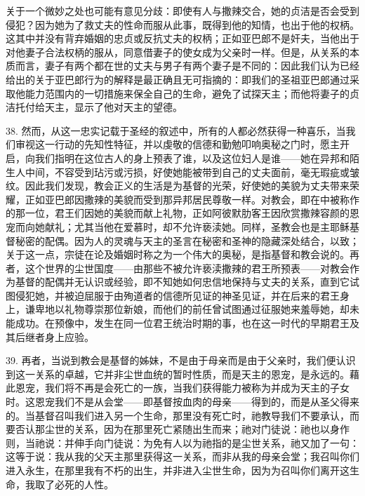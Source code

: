 关于一个微妙之处也可能有意见分歧：即使有人与撒辣交合，她的贞洁是否会受到侵犯？因为她为了救丈夫的性命而服从此事，既得到他的知情，也出于他的权柄。这其中并没有背弃婚姻的忠贞或反抗丈夫的权柄；正如亚巴郎不是奸夫，当他出于对他妻子合法权柄的服从，同意借妻子的使女成为父亲时一样。但是，从关系的本质而言，妻子有两个都在世的丈夫与男子有两个妻子是不同的：因此我们认为已经给出的关于亚巴郎行为的解释是最正确且无可指摘的：即我们的圣祖亚巴郎通过采取他能力范围内的一切措施来保全自己的生命，避免了试探天主；而他将妻子的贞洁托付给天主，显示了他对天主的望德。\par

38. 然而，从这一忠实记载于圣经的叙述中，所有的人都必然获得一种喜乐，当我们审视这一行动的先知性特征，并以虔敬的信德和勤勉叩响奥秘之门时，愿主开启，向我们指明在这位古人的身上预表了谁，以及这位妇人是谁——她在异邦和陌生人中间，不容受到玷污或污损，好使她能被带到自己的丈夫面前，毫无瑕疵或皱纹。因此我们发现，教会正义的生活是为基督的光荣，好使她的美貌为丈夫带来荣耀，正如亚巴郎因撒辣的美貌而受到那异邦居民尊敬一样。对教会，即在中被称作的那一位，君王们因她的美貌而献上礼物，正如阿彼默肋客王因欣赏撒辣容颜的恩宠而向她献礼；尤其当他在爱慕时，却不允许亵渎她。同样，圣教会也是主耶稣基督秘密的配偶。因为人的灵魂与天主的圣言在秘密和圣神的隐藏深处结合，以致；关于这一点，宗徒在论及婚姻时称之为一个伟大的奥秘，是指基督和教会说的。再者，这个世界的尘世国度——由那些不被允许亵渎撒辣的君王所预表——对教会作为基督的配偶并无认识或经验，即不知她如何忠信地保持与丈夫的关系，直到它试图侵犯她，并被迫屈服于由殉道者的信德所见证的神圣见证，并在后来的君王身上，谦卑地以礼物尊崇那位新娘，而他们的前任曾试图通过征服她来羞辱她，却未能成功。在预像中，发生在同一位君王统治时期的事，也在这一时代的早期君王及其后继者身上应验。\par

39. 再者，当说到教会是基督的姊妹，不是由于母亲而是由于父亲时，我们便认识到这一关系的卓越，它并非尘世血统的暂时性质，而是天主的恩宠，是永远的。藉此恩宠，我们将不再是会死亡的一族，当我们获得能力被称为并成为天主的子女时。这恩宠我们不是从会堂——即基督按血肉的母亲——得到的，而是从圣父得来的。当基督召叫我们进入另一个生命，那里没有死亡时，祂教导我们不要承认，而要否认那尘世的关系，因为在那里死亡紧随出生而来；祂对门徒说：祂也以身作则，当祂说：并伸手向门徒说：为免有人以为祂指的是尘世关系，祂又加了一句：这等于说：我从我的父天主那里获得这一关系，而非从我的母亲会堂；我召叫你们进入永生，在那里我有不朽的出生，并非进入尘世生命，因为为召叫你们离开这生命，我取了必死的人性。\par

